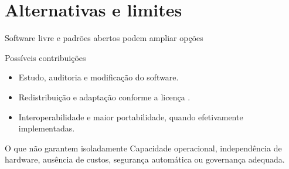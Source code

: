 \section{Alternativas e limites}

\begin{frame}{Software livre e padrões abertos podem ampliar opções}
  \begin{block}{Possíveis contribuições}
    \begin{itemize}
      \item Estudo, auditoria e modificação do software.
      \item Redistribuição e adaptação conforme a licença \parencite{stallman2002free}.
      \item Interoperabilidade e maior portabilidade, quando efetivamente implementadas.
    \end{itemize}
  \end{block}
  \begin{alertblock}{O que não garantem isoladamente}
    Capacidade operacional, independência de hardware, ausência de custos, segurança automática ou governança adequada.
  \end{alertblock}
\end{frame}
